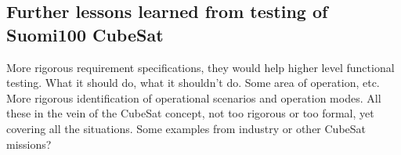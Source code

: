 \documentclass[english,12pt,a4paper,pdftex,elec,utf8]{aaltothesis}
\begin{document}
\subsection{Further lessons learned from testing of Suomi100 CubeSat}
More rigorous requirement specifications, they would help higher level functional testing.
What it should do, what it shouldn't do. Some area of operation, etc. More rigorous identification of operational scenarios and operation modes. All these in the vein of the CubeSat concept, not too rigorous or too formal, yet covering all the situations. Some examples from industry or other CubeSat missions?\par  




\clearpage
\end{document}
